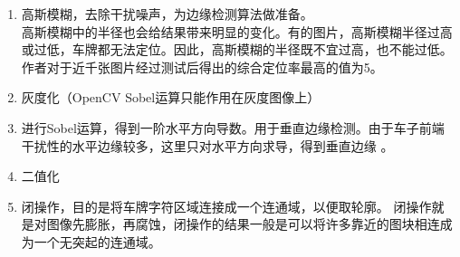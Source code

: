 \begin{enumerate}
\item
高斯模糊，去除干扰噪声，为边缘检测算法做准备。\\
高斯模糊中的半径也会给结果带来明显的变化。有的图片，高斯模糊半径过高或过低，车牌都无法定位。因此，高斯模糊的半径既不宜过高，也不能过低。作者对于近千张图片经过测试后得出的综合定位率最高的值为5。
\item
灰度化（OpenCV Sobel运算只能作用在灰度图像上）
\item
进行Sobel运算，得到一阶水平方向导数。用于垂直边缘检测。由于车子前端干扰性的水平边缘较多，这里只对水平方向求导，得到垂直边缘 。
\item
二值化
\item
闭操作，目的是将车牌字符区域连接成一个连通域，以便取轮廓。
闭操作就是对图像先膨胀，再腐蚀，闭操作的结果一般是可以将许多靠近的图块相连成为一个无突起的连通域。


\end{enumerate}
